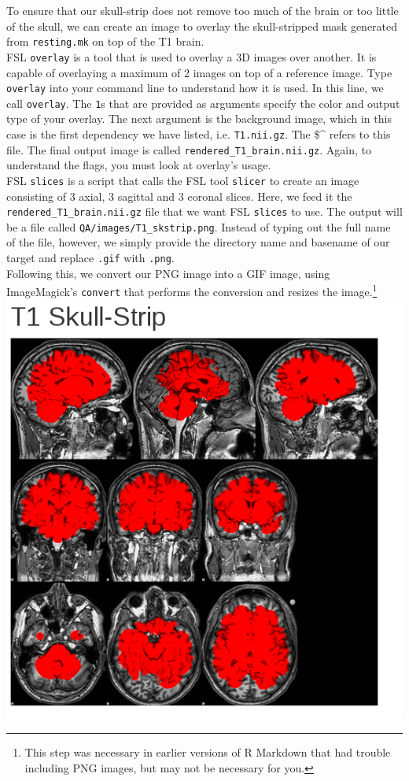 To ensure that our skull-strip does not remove too much of the brain or too little of the skull, we can create an image to overlay the skull-stripped mask generated from \texttt{resting.mk} on top of the T1 brain. \\
\tab{} FSL \texttt{overlay} is a tool that is used to overlay a 3D images over another. It is capable of overlaying a maximum of 2 images on top of a reference image. Type \texttt{overlay} into your command line to understand how it is used. In this line, we call \texttt{overlay}. The \texttt{1}s that are provided as arguments specify the color and output type of your overlay. The next argument is the background image, which in this case is the first dependency we have listed, i.e. \texttt{T1.nii.gz}. The \$\textasciicircum{} refers to this file. The final output image is called \texttt{rendered\_T1\_brain.nii.gz}. Again, to understand the flags, you must look at overlay's usage. \\
 FSL \texttt{slices} is a script that calls the FSL tool \texttt{slicer} to create an image consisting of 3 axial, 3 sagittal and 3 coronal slices. Here, we feed it the \texttt{rendered\_T1\_brain.nii.gz} file that we want FSL \texttt{slices} to use. The output will be a file called \texttt{QA/images/T1\_skstrip.png}. Instead of typing out the full name of the file, however, we simply provide the directory name and basename of our target and replace \texttt{.gif} with \texttt{.png}. \\
 Following this, we convert our PNG image into a GIF image, using ImageMagick's \texttt{convert} that performs the conversion and resizes the image.\footnote{This step was necessary in earlier versions of R Markdown that had trouble including PNG images, but may not be necessary for you.}\\

\includegraphics[scale=0.4]{images/QAskullstrip.png}

